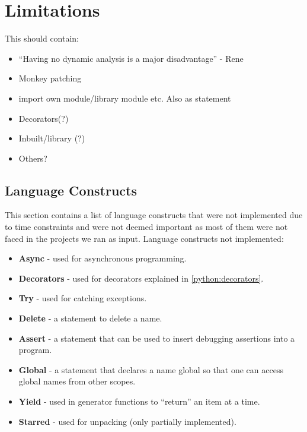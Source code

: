\section{Limitations}
This should contain:
\begin{itemize}
\item ``Having no dynamic analysis is a major disadvantage'' - Rene
\item Monkey patching
\item import own module/library module etc. Also as statement
\item Decorators(?)
\item Inbuilt/library (?)
\item Others?
\end{itemize}

\subsection{Language Constructs}
This section contains a list of language constructs that were not implemented due to time constraints and were not deemed important as most of them were not faced in the projects we ran as input.
Language constructs not implemented:
\begin{itemize}
\item \textbf{Async} - used for asynchronous programming.\cite{python_async}
\item \textbf{Decorators} - used for decorators explained in \cref{python:decorators}.
\item \textbf{Try} - used for catching exceptions.\cite{python_exception}
\item \textbf{Delete} - a statement to delete a name.\cite{python_delete}
\item \textbf{Assert} - a statement that can be used to insert debugging assertions into a program.\cite{python_assert}
\item \textbf{Global} - a statement that declares a name global so that one can access global names from other scopes.\cite{python_global}
\item \textbf{Yield} - used in generator functions to ``return'' an item at a time.\cite{python_yield}
\item \textbf{Starred} - used for unpacking (only partially implemented).\cite{python_unpacking}
\end{itemize}

